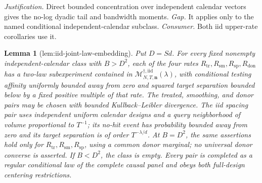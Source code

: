 \documentclass{article}
\newtheorem{lemma}{Lemma}
\begin{document}
\par\smallskip\noindent \textit{Justification.} Direct bounded concentration over independent calendar vectors gives the no-log dyadic tail and bandwidth moments. \textit{Gap.} It applies only to the named conditional independent-calendar subclass. \textit{Consumer.} Both iid upper-rate corollaries use it.

\begin{lemma}[lem:iid-joint-law-embedding]\label{lem:iid-joint-law-embedding}
Put \(D=Sd\).  For every fixed nonempty independent-calendar class with \(B>D^2\), each of the four rates \(R_{\mathrm{tr}},R_{\mathrm{sm}},R_{\mathrm{sp}},R_{\mathrm{don}}\) has a two-law subexperiment contained in \(\mathcal M_{N,T,\mathbf n}^{\dagger,\mathrm{iid}}(\lambda)\), with conditional testing affinity uniformly bounded away from zero and squared target separation bounded below by a fixed positive multiple of that rate.  The treated, smoothing, and donor pairs may be chosen with bounded Kullback--Leibler divergence.  The iid spacing pair uses independent uniform calendar designs and a query neighborhood of volume proportional to \(T^{-1}\); its no-hit event has probability bounded away from zero and its target separation is of order \(T^{-\lambda/d}\).  At \(B=D^2\), the same assertions hold only for \(R_{\mathrm{tr}},R_{\mathrm{sm}},R_{\mathrm{sp}}\), using a common donor marginal; no universal donor converse is asserted.  If \(B<D^2\), the class is empty.  Every pair is completed as a regular conditional law of the complete causal panel and obeys both full-design centering restrictions.
\end{lemma}
\end{document}
